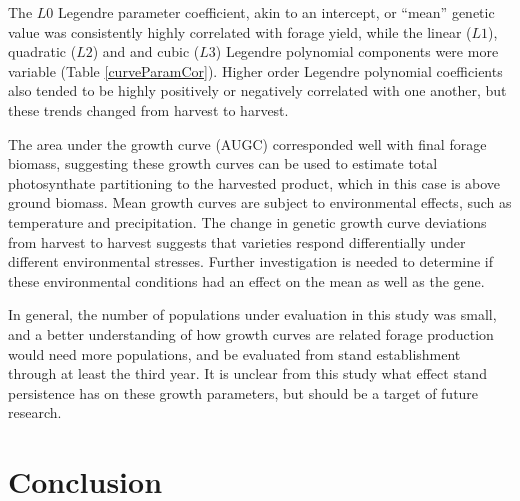 \documentclass[12pt, letterpaper]{article}
\begin{document}
The $L0$ Legendre parameter coefficient, akin to an intercept, or ``mean'' genetic value  was consistently highly correlated with forage yield, while the linear ($L1$), quadratic ($L2$) and and cubic ($L3$) Legendre polynomial components were more variable (Table \ref{curveParamCor}). Higher order Legendre polynomial coefficients also tended to be highly positively or negatively correlated with one another, but these trends changed from harvest to harvest. 

The area under the growth curve (AUGC) corresponded well with final forage biomass, suggesting these growth curves can be used to estimate total photosynthate partitioning to the harvested product, which in this case is above ground biomass. Mean growth curves are subject to environmental effects, such as temperature and precipitation. The change in genetic growth curve deviations from harvest to harvest suggests that varieties respond differentially under different environmental stresses. Further investigation is needed to determine if these environmental conditions had an effect on the  mean as well as the gene.



In general, the number of populations under evaluation in this study was small, and a better understanding of how growth curves are related forage production would need more populations, and be evaluated from stand establishment through at least the third year. It is unclear from this study what effect stand persistence has on these growth parameters, but should be a target of future research. 




\section{Conclusion}

\end{document}
